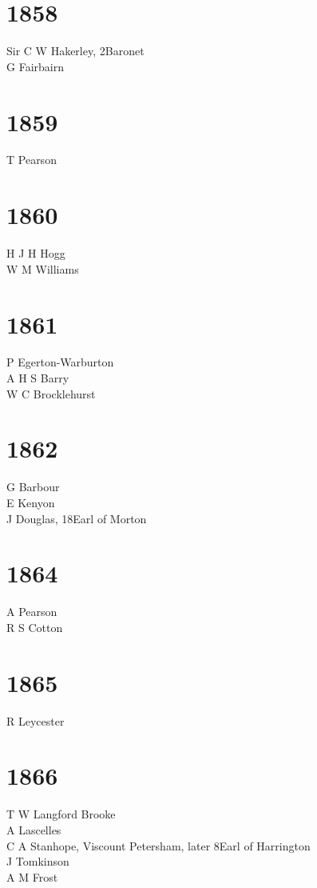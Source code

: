 \begin{multicols}{2}
  \section*{1858}
  Sir C W Hakerley, 2\nd Baronet \\
  G Fairbairn \\
  \section*{1859}
  T Pearson \\
  \section*{1860}
  H J H Hogg \\
  W M Williams \\
  \section*{1861}
  P Egerton-Warburton \\
  A H S Barry \\
  W C Brocklehurst \\
  \section*{1862}
  G Barbour \\
  E Kenyon \\
  J Douglas, 18\nth Earl of Morton \\
  \section*{1864}
  A Pearson \\
  R S Cotton \\
  \section*{1865}
  R Leycester \\
  \section*{1866}
  T W Langford Brooke \\
  A Lascelles \\
  C A Stanhope, Viscount Petersham, later 8\nth Earl of Harrington \\
  J Tomkinson \\
  A M Frost \\

\end{multicols}
